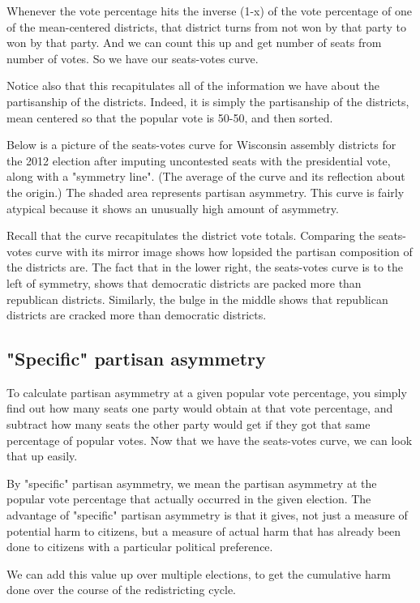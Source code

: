 \documentclass[preprint,12pt]{article}
\begin{document}
Whenever the vote percentage hits the inverse (1-x) of the vote percentage of one of the mean-centered districts, that district turns from not won by that party to won by that party.  And we can count this up and get number of seats from number of votes.   So we have our seats-votes curve.
 
Notice also that this recapitulates all of the information we have about the partisanship of the districts.   Indeed, it is simply the partisanship of the districts, mean centered so that the popular vote is 50-50, and then sorted.
 
Below is a picture of the seats-votes curve for Wisconsin assembly districts for the 2012 election after imputing uncontested seats with the presidential vote, along with a "symmetry line".  (The average of the curve and its reflection about the origin.)  The shaded area represents partisan asymmetry.  This curve is fairly atypical because it shows an unusually high amount of asymmetry.
 
Recall that the curve recapitulates the district vote totals.  Comparing the seats-votes curve with its mirror image shows how lopsided the partisan composition of the districts are.  The fact that in the lower right, the seats-votes curve is to the left of symmetry, shows that democratic districts are packed more than republican districts. Similarly, the bulge in the middle shows that republican districts are cracked more than democratic districts.

 
\subsection{"Specific" partisan asymmetry}
 
To calculate partisan asymmetry at a given popular vote percentage, you simply find out how many seats one party would obtain at that vote percentage, and subtract how many seats the other party would get if they got that same percentage of popular votes.  Now that we have the seats-votes curve, we can look that up easily.
 
By "specific" partisan asymmetry, we mean the partisan asymmetry at the popular vote percentage that actually occurred in the given election.   The advantage of "specific" partisan asymmetry is that it gives, not just a measure of potential harm to citizens, but a measure of actual harm that has already been done to citizens with a particular political preference.
 
We can add this value up over multiple elections, to get the cumulative harm done over the course of the redistricting cycle.
 
\end{document}
